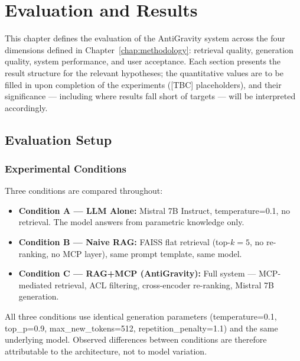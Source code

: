\chapter{Evaluation and Results}
\label{chap:evaluation}

This chapter defines the evaluation of the AntiGravity system across the four dimensions defined in Chapter~\ref{chap:methodology}: retrieval quality, generation quality, system performance, and user acceptance. Each section presents the result structure for the relevant hypotheses; the quantitative values are to be filled in upon completion of the experiments ([TBC] placeholders), and their significance --- including where results fall short of targets --- will be interpreted accordingly.

\section{Evaluation Setup}
\label{sec:eval-setup}

\subsection{Experimental Conditions}

Three conditions are compared throughout:

\begin{itemize}
\item \textbf{Condition A --- LLM Alone:} Mistral 7B Instruct, temperature=0.1, no retrieval. The model answers from parametric knowledge only.
\item \textbf{Condition B --- Naive RAG:} FAISS flat retrieval (top-$k=5$, no re-ranking, no MCP layer), same prompt template, same model.
\item \textbf{Condition C --- RAG+MCP (AntiGravity):} Full system --- MCP-mediated retrieval, ACL filtering, cross-encoder re-ranking, Mistral 7B generation.
\end{itemize}

All three conditions use identical generation parameters (temperature=0.1, top\_p=0.9, max\_new\_tokens=512, repetition\_penalty=1.1) and the same underlying model. Observed differences between conditions are therefore attributable to the architecture, not to model variation.

